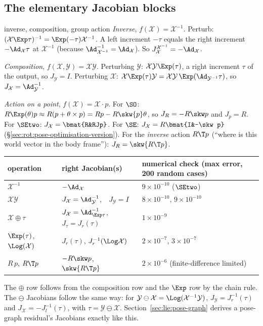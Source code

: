 \subsection{The elementary Jacobian blocks}\label{sec:lie:elementary}

\begin{deriv}{inverse, composition, group action}
\emph{Inverse}, $f(\mathcal X)=\mathcal X^{-1}$. Perturb: $(\mathcal X\Exp\tau)^{-1}=\Exp(-\tau)\mathcal X^{-1}$. A left increment $-\tau$ equals the right increment $-\Ad_{\mathcal X}\tau$ at $\mathcal X^{-1}$ (because $\Ad_{\mathcal X^{-1}}^{-1}=\Ad_{\mathcal X}$). So $J^{\mathcal X^{-1}}_{\mathcal X}=-\Ad_{\mathcal X}$.

\emph{Composition}, $f(\mathcal X,\mathcal Y)=\mathcal X\mathcal Y$. Perturbing $\mathcal Y$: $\mathcal X\mathcal Y\Exp(\tau)$, a right increment $\tau$ of the output, so $J_{\mathcal Y}=I$. Perturbing $\mathcal X$: $\mathcal X\Exp(\tau)\mathcal Y=\mathcal X\mathcal Y\,\Exp(\Ad_{\mathcal Y^{-1}}\tau)$, so $J_{\mathcal X}=\Ad_{\mathcal Y}^{-1}$.

\emph{Action on a point}, $f(\mathcal X)=\mathcal X\cdot p$. For $\SO$: $R\Exp(\theta)p\approx R(p+\theta\times p)=Rp-R\skw{p}\theta$, so $J_R=-R\skw p$ and $J_p=R$. For $\SEtwo$: $J_{\mathcal X}=\bmat{R&RJp}$. For $\SE$: $J_{\mathcal X}=R\bmat{I&-\skw p}$ (\S\ref{sec:rot:pose-optimisation-version}). For the \emph{inverse} action $R\T p$ (``where is this world vector in the body frame''): $J_R=\skw{R\T p}$.
\end{deriv}

\begin{center}\small
\renewcommand{\arraystretch}{1.25}
\begin{tabular}{@{}lll@{}}\toprule
operation & right Jacobian(s) & numerical check (max error, 200 random cases)\\\midrule
$\mathcal X^{-1}$ & $-\Ad_{\mathcal X}$ & $9\times10^{-10}$ ($\SEtwo$)\\
$\mathcal X\mathcal Y$ & $J_{\mathcal X}=\Ad_{\mathcal Y}^{-1}$,\ \ $J_{\mathcal Y}=I$ & $8\times10^{-10}$, $9\times10^{-10}$\\
$\mathcal X\oplus\tau$ & $J_{\mathcal X}=\Ad_{\Exp\tau}^{-1}$,\ \ $J_\tau=J_r(\tau)$ & $1\times10^{-9}$\\
$\Exp(\tau)$, $\Log(\mathcal X)$ & $J_r(\tau)$, $J_r^{-1}(\Log\mathcal X)$ & $2\times10^{-7}$, $3\times10^{-7}$\\
$R\,p$, $R\T p$ & $-R\skw p$, $\skw{R\T p}$ & $2\times10^{-6}$ (finite-difference limited)\\\bottomrule
\end{tabular}
\end{center}
The $\oplus$ row follows from the composition row and the $\Exp$ row by the chain rule. The $\ominus$ Jacobians follow the same way: for $\mathcal Y\ominus\mathcal X=\Log(\mathcal X^{-1}\mathcal Y)$, $J_{\mathcal Y}=J_r^{-1}(\tau)$ and $J_{\mathcal X}=-J_l^{-1}(\tau)$, with $\tau=\mathcal Y\ominus\mathcal X$. Section~\ref{sec:lie:pose-graph} derives a pose-graph residual's Jacobians exactly like this.
